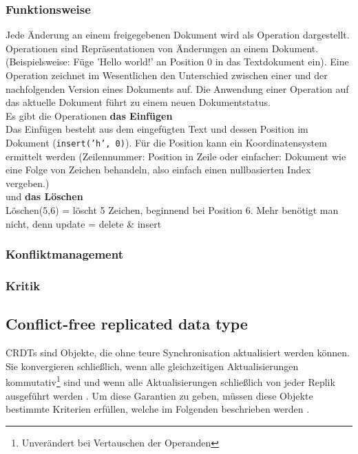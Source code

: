 \subsubsection{Funktionsweise}
Jede Änderung an einem freigegebenen Dokument wird als Operation dargestellt. Operationen sind Repräsentationen von Änderungen an einem Dokument. (Beispielsweise: Füge 'Hello world!' an Position 0 in das Textdokument ein).  Eine Operation zeichnet im Wesentlichen den Unterschied zwischen einer und der nachfolgenden Version eines Dokuments auf. Die Anwendung einer Operation auf das aktuelle Dokument führt zu einem neuen Dokumentstatus.\\
Es gibt die Operationen \textbf{das Einfügen}\\
Das Einfügen besteht aus dem eingefügten Text und dessen Position im Dokument (\texttt{insert('h', 0)}).
Für die Position kann ein Koordinatensystem ermittelt werden (Zeilennummer: Position in Zeile oder einfacher: Dokument wie eine Folge von Zeichen behandeln, also einfach einen nullbasierten Index vergeben.)\\
und \textbf{das Löschen}\\
Löschen(5,6) = löscht 5 Zeichen, beginnend bei Position 6.
Mehr benötigt man nicht, denn update = delete \& insert
\subsubsection{Konfliktmanagement}

\cite{ot}
\subsubsection{Kritik}
%
%
\subsection{Conflict-free replicated data type}
CRDTs sind Objekte, die ohne teure Synchronisation aktualisiert werden können. Sie konvergieren schließlich, wenn alle gleichzeitigen Aktualisierungen kommutativ\footnote{Unverändert bei Vertauschen der Operanden} sind und wenn alle Aktualisierungen schließlich von jeder Replik ausgeführt werden \cite{crdt_shapiro}.
Um diese Garantien zu geben, müssen diese Objekte bestimmte Kriterien erfüllen, welche im Folgenden beschrieben werden \cite{crdt_shapiro2}.
